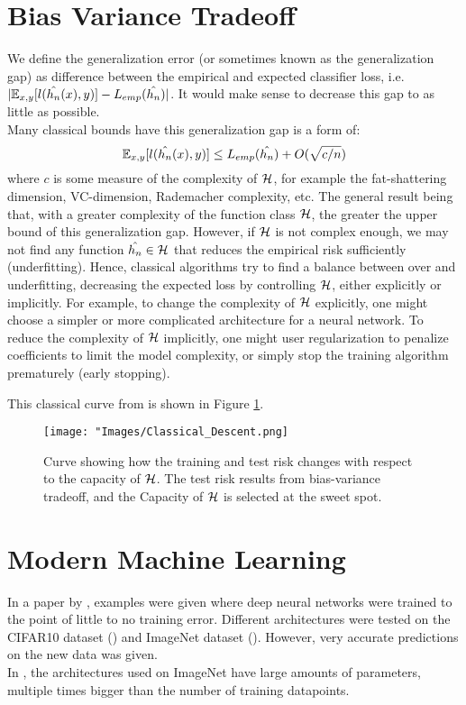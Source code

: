 \documentclass[twoside]{memoir}
\begin{document}
\section{Bias Variance Tradeoff}
We define the generalization error (or sometimes known as the generalization gap) as difference between the empirical and expected classifier loss, i.e. $ \lvert \mathbb{E}_{x,y}[l(\hat{h_n}(x), y)] - L_{emp}(\hat{h_n}) \rvert $. It would make sense to decrease this gap to as little as possible.\\
Many classical bounds have this generalization gap is a form of:
\begin{equation} \label{eqn:Generalization_Gap}
\mathbb{E}_{x,y}[l(\hat{h_n}(x), y)] \leq L_{emp}(\hat{h_n}) + O(\sqrt{c/n})
\end{equation}
where $c$ is some  measure of the complexity of $\mathcal{H}$, for example the fat-shattering dimension, VC-dimension, Rademacher complexity, etc. The general result being that, with a greater complexity of the function class $\mathcal{H}$, the greater the upper bound of this generalization gap. However, if $\mathcal{H}$ is not complex enough, we may not find any function $\hat{h_n} \in \mathcal{H}$ that reduces the empirical risk sufficiently (underfitting). Hence, classical algorithms try to find a balance between over and underfitting, decreasing the expected loss by controlling $\mathcal{H}$, either explicitly or implicitly.
For example, to change the complexity of $\mathcal{H}$ explicitly, one might choose a simpler or more complicated architecture for a neural network. To reduce the complexity of $\mathcal{H}$ implicitly, one might user regularization to  penalize coefficients to limit the model complexity, or simply stop the training algorithm prematurely (early stopping).

This classical curve from \cite{Belkin_2019} is shown in Figure \ref{fig:Classical_Descent}.
\begin{figure}
	\centering
	\texttt{[image: "Images/Classical\_Descent.png]}
	\par
	\caption{Curve showing how the training and test risk changes with respect to the capacity of $\mathcal{H}$. The test risk results from bias-variance tradeoff, and the Capacity of $\mathcal{H}$ is selected at the sweet spot.} \label{fig:Classical_Descent}
\end{figure}

\section{Modern Machine Learning}
In a paper by \cite{Zhang_Deep_Learning}, examples were given where  deep neural networks were trained to the point of little to no training error. Different architectures were tested on the CIFAR10 dataset (\cite{krizhevsky2009learning}) and ImageNet dataset (\cite{Russakovsky_2015}). However, very accurate predictions on the new data was given.\\
In \cite{Alfredo2016}, the architectures used on ImageNet have large amounts of parameters, multiple times bigger than the number of training datapoints.
\end{document}
